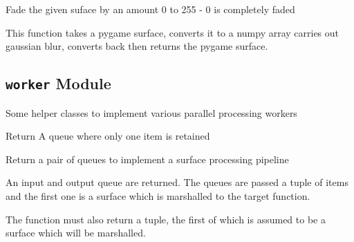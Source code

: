 \documentclass[letterpaper,10pt,english]{sphinxmanual}
\begin{document}

\begin{fulllineitems}
\label{blocks:serge.blocks.visualeffects.fadeSurface}
Fade the given suface by an amount 0 to 255 - 0 is completely faded

\end{fulllineitems}


\begin{fulllineitems}
\label{blocks:serge.blocks.visualeffects.gaussianBlur}
This function takes a pygame surface, converts it to a numpy array
carries out gaussian blur, converts back then returns the pygame surface.

\end{fulllineitems}



\subsection{\texttt{worker} Module}
\label{blocks:worker-module}\label{blocks:module-serge.blocks.worker}
Some helper classes to implement various parallel processing workers

\begin{fulllineitems}
\label{blocks:serge.blocks.worker.SkippableQueue}
Return A queue where only one item is retained

\end{fulllineitems}


\begin{fulllineitems}
\label{blocks:serge.blocks.worker.getSurfaceProcessingPipeline}
Return a pair of queues to implement a surface processing pipeline

An input and output queue are returned. The queues are passed a tuple of items
and the first one is a surface which is marshalled to the target function.

The function must also return a tuple, the first of which is assumed to be a surface
which will be marshalled.

\end{fulllineitems}
\end{document}
